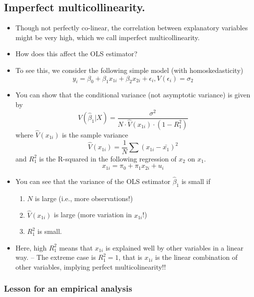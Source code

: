\documentclass[]{book}
\providecommand{\tightlist}{%
  \setlength{\itemsep}{0pt}\setlength{\parskip}{0pt}}
\begin{document}
\subsection{Imperfect
multicollinearity.}\label{imperfect-multicollinearity.}

\begin{itemize}
\tightlist
\item
  Though not perfectly co-linear, the correlation between explanatory
  variables might be very high, which we call imperfect
  multicollinearity.
\item
  How does this affect the OLS estimator?
\item
  To see this, we consider the following simple model (with
  homoskedasticity) \[
  y_i = \beta_0 + \beta_1 x_{1i} + \beta_2 x_{2i} + \epsilon_i, V(\epsilon_i) = \sigma_2
  \]
\item
  You can show that the conditional variance (not asymptotic variance)
  is given by \[
  V(\hat\beta_1 | X) = \frac{\sigma^{2}}{N\cdot\hat{V}(x_{1i})\cdot(1-R_{1}^{2})}
  \] where \(\hat V(x_{1i})\) is the sample variance \[
  \hat V(x_{1i})  =\frac{1}{N}\sum(x_{1i}-\bar{x_{1}})^{2}
  \] and \(R_{1}^{2}\) is the R-squared in the following regression of
  \(x_2\) on \(x_1\). \[
  x_{1i} = \pi_0 + \pi_1 x_{2i} + u_i 
  \]
\item
  You can see that the variance of the OLS estimator \(\hat{\beta}_{1}\)
  is small if

  \begin{enumerate}
  \def\labelenumi{\arabic{enumi}.}
  \tightlist
  \item
    \(N\) is large (i.e., more observations!)
  \item
    \(\hat V(x_{1i})\) is large (more variation in \(x_{1i}\)!)
  \item
    \(R_{1}^{2}\) is small.
  \end{enumerate}
\item
  Here, high \(R_{1}^{2}\) means that \(x_{1i}\) is explained well by
  other variables in a linear way. -- The extreme case is
  \(R_{1}^{2}=1\), that is \(x_{1i}\) is the linear combination of other
  variables, implying perfect multicolinearity!!
\end{itemize}

\subsubsection{Lesson for an empirical
analysis}\label{lesson-for-an-empirical-analysis}
\end{document}
